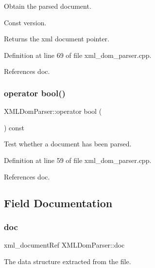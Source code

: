 Obtain the parsed document. 

Const version. \begin{DoxyReturn}{Returns}
the xml document pointer. 
\end{DoxyReturn}


Definition at line 69 of file xml\+\_\+dom\+\_\+parser.\+cpp.



References doc.

\mbox{\label{classXMLDomParser_a0f35bed94b75e24953adce591b503cb0}} 
\subsubsection{\texorpdfstring{operator bool()}{operator bool()}}
{\footnotesize\ttfamily X\+M\+L\+Dom\+Parser\+::operator bool (\begin{DoxyParamCaption}{ }\end{DoxyParamCaption}) const}



Test whether a document has been parsed. 



Definition at line 59 of file xml\+\_\+dom\+\_\+parser.\+cpp.



References doc.



\subsection{Field Documentation}
\mbox{\label{classXMLDomParser_ac31ace6dd3dfbcbac73044d73bba2821}} 
\subsubsection{\texorpdfstring{doc}{doc}}
{\footnotesize\ttfamily xml\+\_\+document\+Ref X\+M\+L\+Dom\+Parser\+::doc\hspace{0.3cm}{\ttfamily [protected]}}



The data structure extracted from the file. 



